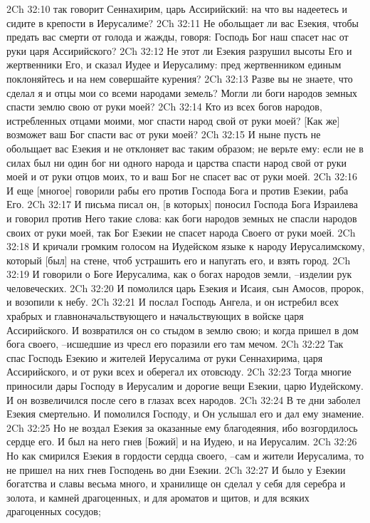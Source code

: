 2Ch 32:10  так говорит Сеннахирим, царь Ассирийский: на что вы надеетесь и сидите в крепости в Иерусалиме?
2Ch 32:11  Не обольщает ли вас Езекия, чтобы предать вас смерти от голода и жажды, говоря: Господь Бог наш спасет нас от руки царя Ассирийского?
2Ch 32:12  Не этот ли Езекия разрушил высоты Его и жертвенники Его, и сказал Иудее и Иерусалиму: пред жертвенником единым поклоняйтесь и на нем совершайте курения?
2Ch 32:13  Разве вы не знаете, что сделал я и отцы мои со всеми народами земель? Могли ли боги народов земных спасти землю свою от руки моей?
2Ch 32:14  Кто из всех богов народов, истребленных отцами моими, мог спасти народ свой от руки моей? [Как же] возможет ваш Бог спасти вас от руки моей?
2Ch 32:15  И ныне пусть не обольщает вас Езекия и не отклоняет вас таким образом; не верьте ему: если не в силах был ни один бог ни одного народа и царства спасти народ свой от руки моей и от руки отцов моих, то и ваш Бог не спасет вас от руки моей.
2Ch 32:16  И еще [многое] говорили рабы его против Господа Бога и против Езекии, раба Его.
2Ch 32:17  И письма писал он, [в которых] поносил Господа Бога Израилева и говорил против Него такие слова: как боги народов земных не спасли народов своих от руки моей, так Бог Езекии не спасет народа Своего от руки моей.
2Ch 32:18  И кричали громким голосом на Иудейском языке к народу Иерусалимскому, который [был] на стене, чтоб устрашить его и напугать его, и взять город.
2Ch 32:19  И говорили о Боге Иерусалима, как о богах народов земли, --изделии рук человеческих.
2Ch 32:20  И помолился царь Езекия и Исаия, сын Амосов, пророк, и возопили к небу.
2Ch 32:21  И послал Господь Ангела, и он истребил всех храбрых и главноначальствующего и начальствующих в войске царя Ассирийского. И возвратился он со стыдом в землю свою; и когда пришел в дом бога своего, --исшедшие из чресл его поразили его там мечом.
2Ch 32:22  Так спас Господь Езекию и жителей Иерусалима от руки Сеннахирима, царя Ассирийского, и от руки всех и оберегал их отовсюду.
2Ch 32:23  Тогда многие приносили дары Господу в Иерусалим и дорогие вещи Езекии, царю Иудейскому. И он возвеличился после сего в глазах всех народов.
2Ch 32:24  В те дни заболел Езекия смертельно. И помолился Господу, и Он услышал его и дал ему знамение.
2Ch 32:25  Но не воздал Езекия за оказанные ему благодеяния, ибо возгордилось сердце его. И был на него гнев [Божий] и на Иудею, и на Иерусалим.
2Ch 32:26  Но как смирился Езекия в гордости сердца своего, --сам и жители Иерусалима, то не пришел на них гнев Господень во дни Езекии.
2Ch 32:27  И было у Езекии богатства и славы весьма много, и хранилище он сделал у себя для серебра и золота, и камней драгоценных, и для ароматов и щитов, и для всяких драгоценных сосудов;
